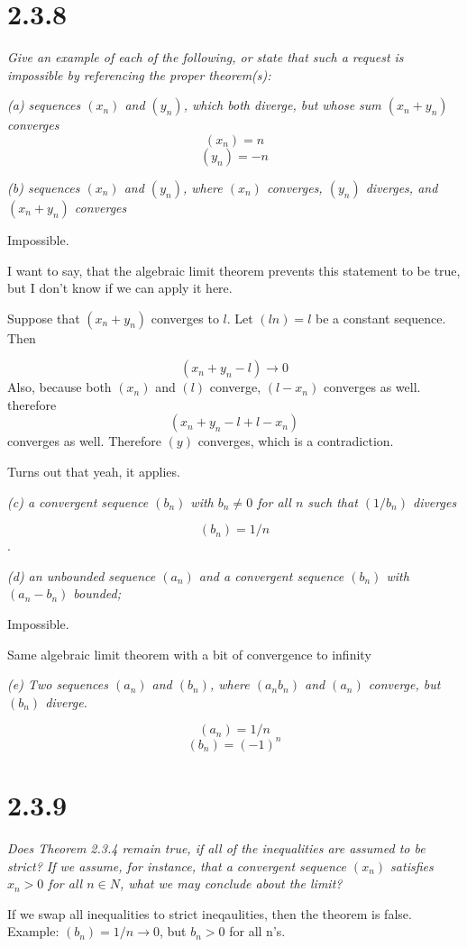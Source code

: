 \documentclass[11pt,oneside,titlepage]{article}
\begin{document}
\section*{2.3.8}
\textit{Give an example of each of the following, or state that such a
  request is impossible by referencing the proper theorem(s):}

\textit{(a) sequences $(x_n)$ and $(y_n)$, which both diverge, but
  whose sum $(x_n + y_n)$ converges}
$$(x_n) = n$$
$$(y_n) = -n$$

\textit{(b) sequences $(x_n)$ and $(y_n)$, where $(x_n)$ converges, $(y_n)$
  diverges, and $(x_n + y_n)$ converges}

Impossible.

I want to say, that the algebraic limit theorem prevents 
this statement to be true, but I don't know if we can apply it here.

Suppose that $(x_n + y_n)$ converges to $l$. Let $(ln) = l$ be a constant
sequence. Then

$$(x_n + y_n - l) \to 0$$
Also, because both $(x_n)$ and $(l)$ converge, $(l - x_n)$ converges as well.
therefore
$$(x_n + y_n - l+ l - x_n)$$ converges as well. Therefore $(y)$ converges,
which is a contradiction.

Turns out that yeah, it applies.

\textit{(c) a convergent sequence $(b_n)$ with $b_n \neq 0$ for all $n$ such
  that $(1/b_n)$ diverges}

$$(b_n) = 1/n$$.

\textit{(d) an unbounded sequence $(a_n)$ and a convergent sequence $(b_n)$
  with $(a_n - b_n)$ bounded;}

Impossible.

Same algebraic limit theorem with a bit of convergence to infinity

\textit{(e) Two sequences $(a_n)$ and $(b_n)$, where $(a_n b_n)$ and
  $(a_n)$ converge, but $(b_n)$ diverge.}

$$(a_n) = 1/n$$
$$(b_n) = (-1)^n$$

\section*{2.3.9}
\textit{Does Theorem 2.3.4 remain true, if all of the inequalities are
  assumed to be strict? If we assume, for instance, that a convergent
  sequence $(x_n)$ satisfies $x_n > 0$ for all $n \in N$, what we may conclude
  about the limit?}

If we swap all inequalities to strict ineqaulities, then the theorem is false.
Example: $(b_n) = 1/n \to 0$, but $b_n > 0$ for all n's.
\end{document}
